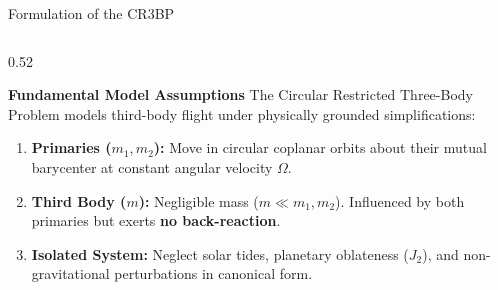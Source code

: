 \documentclass[aspectratio=169, 10pt]{beamer}
\begin{document}
\begin{frame}{Formulation of the CR3BP}
    \begin{columns}[t]
        \begin{column}{0.52\textwidth}
            \begin{block}{\textbf{Fundamental Model Assumptions}}
                \scriptsize
                The Circular Restricted Three-Body Problem models third-body flight under physically grounded simplifications:
                \begin{enumerate}\setlength{\itemsep}{2pt}
                    \item \textbf{Primaries ($m_1, m_2$):} Move in circular coplanar orbits about their mutual barycenter at constant angular velocity $\Omega$.
                    \item \textbf{Third Body ($m$):} Negligible mass ($m \ll m_1, m_2$). Influenced by both primaries but exerts \textbf{no back-reaction}.
                    \item \textbf{Isolated System:} Neglect solar tides, planetary oblateness ($J_2$), and non-gravitational perturbations in canonical form.
                \end{enumerate}
            \end{block}
        \end{column}
        

\end{columns}
\end{frame}
\end{document}
